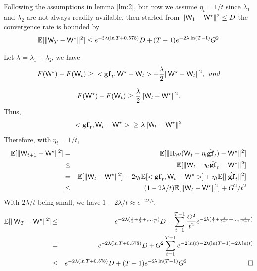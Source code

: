 \documentclass{article} %
\newcommand{\cW}{{\bf \mathsf{W}}}
\newcommand{\cE}{{\mathbb{E}}}
\newcommand{\gf}{{\bf gf}}
\newcommand{\cWs}{{\bf \mathsf{W}}^{\star}}
\newenvironment{proof}[1][Proof]{\begin{trivlist}
\item[\hskip \labelsep {\bfseries #1}]}{\end{trivlist}}
\begin{document}
{\lemma \label{lm:3}
Following the assumptions in lemma \ref{lm:2}, but now we assume $\eta_t=1/t$ since $\lambda_1$ and $\lambda_2$ are not always readily available, then started from $\lVert \cW_1-\cW^{\star} \rVert^2 \le D$ the convergence rate is bounded by
\begin{equation}
\cE[\lVert \cW_T - \cWs \rVert^2] \le e^{-2\lambda (\ln T + 0.578)} D + (T-1) e^{-2\lambda \ln(T-1)} G^2
\end{equation}
}
\begin{proof} 
Let $\lambda = \lambda_1 + \lambda_2$, we have
\[
   F(\cWs )- F(\cW_t) \ge \;\;<\gf_t, \cWs - \cW_t> + \frac{\lambda}{2} \lVert \cWs - \cW_t \rVert^2, \;\;and
\]

\[
   F(\cWs) - F(\cW_t) \ge \frac{\lambda}{2} \lVert \cW_t- \cWs \rVert^2.
\]
Thus,
\[
   <\gf_t, \cW_t - \cWs> \;\; \ge \lambda \lVert \cW_t- \cWs \rVert^2
\]
Therefore, with $\eta_t=1/t$,
\begin{eqnarray}
 \cE[\lVert \cW_{t+1} - \cWs \rVert^2] &=& \cE[\lVert \Pi_{\mathcal{W}}(\cW_{t} - \eta_t \hat{\gf}_t) - \cWs \rVert^2] \nonumber \\
 &\le& \cE[\lVert \cW_{t} - \eta_t \hat{\gf}_t - \cWs \rVert^2] \nonumber \\
&=& \cE[\lVert \cW_{t} - \cWs \rVert^2] - 2 \eta_t \cE[<\gf_t, \cW_t-\cWs>] + \eta_t \cE[\lVert \hat{\gf}_t \rVert^2] \nonumber \\
&\le& (1-2\lambda/t) \cE[\lVert \cW_{t} - \cWs \rVert^2] + G^2/t^2
\end{eqnarray}
With $2\lambda/t$ being small, we have $1-2\lambda/t \approx e^{-2\lambda/t}.$
\begin{eqnarray}
\cE[\lVert \cW_T - \cWs \rVert^2] &\le& e^{-2\lambda(\frac{1}{1}+\frac{1}{2}+,..,\frac{1}{T})} D + \sum_{t=1}^{T-1} \frac{G^2}{t^2} e^{-2\lambda(\frac{1}{t}+\frac{1}{t+1}+,..,\frac{1}{T-1})} \nonumber \\
&=& e^{-2\lambda (\ln T + 0.578)} D + G^2 \sum_{t=1}^{T-1} e^{-2 \ln(t)- 2 \lambda(\ln(T-1)-2\lambda \ln(t)} \nonumber \\
&\le& e^{-2\lambda (\ln T + 0.578)} D + (T-1) e^{-2\lambda \ln(T-1)} G^2 \nonumber \quad\quad\quad\quad\quad\quad\quad\quad\quad  \square
\end{eqnarray}
\end{proof}
\end{document}
